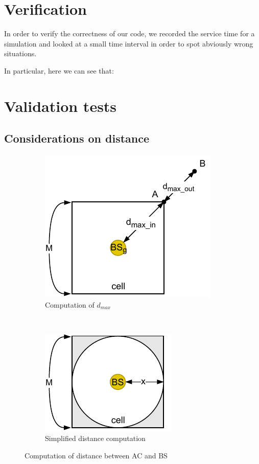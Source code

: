 \documentclass[a4paper,12pt]{article}
\begin{document}
\section{Verification}
In order to verify the correctness of our code, we recorded the service time for a simulation and looked at a small time interval in order to spot abviously wrong situations.

In particular, here we can see that:

\section{Validation tests}
\subsection{Considerations on distance}
\begin{figure}[H]
  \centering
  \begin{subfigure}[b]{0.45\textwidth}
    \centering
    \includegraphics{img/dmax.pdf}
    \caption{Computation of $d_{max}$}
    \label{fig:dmax}
  \end{subfigure}
  ~
  \begin{subfigure}[b]{0.45\textwidth}
    \centering
    \includegraphics{img/d-simplified.pdf}
    \caption{Simplified distance computation}
    \label{fig:d-simplified}
  \end{subfigure}
  \caption{Computation of distance between AC and BS}
  \label{fig:d}
\end{figure}
\end{document}
